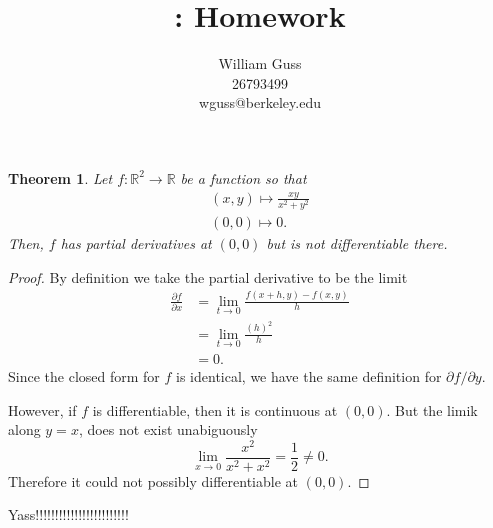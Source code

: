 \documentclass[letter]{article}
\title{\bCLASS: Homework \bHWN}
\author{William Guss\\26793499\\wguss@berkeley.edu}
\newtheorem{theorem}{Theorem}
\newenvironment{menumerate}{%
  \edef\backupindent{\the\parindent}%
  \enumerate%
  \setlength{\parindent}{\backupindent}%
}{\endenumerate}
\begin{document}
\maketitle
\thispagestyle{empty}

\begin{menumerate}
    \setcounter{enumi}{14}
    \item 
    \begin{theorem}
        Let $f: \mathbb{R}^2 \to \mathbb{R}$ be a function so that
        \begin{equation}
            \begin{aligned}
            (x,y) \mapsto \frac{xy}{x^2 + y^2} \\
            (0,0) \mapsto 0.          
            \end{aligned}          
        \end{equation}   
        Then, $f$ has partial derivatives at $(0,0)$ but is not differentiable
        there.
    \end{theorem}
    \begin{proof}
        By definition we take the partial derivative to be the limit
        \begin{equation}
            \begin{aligned}
            \frac{\partial f}{\partial x} &= \lim_{t\to 0} \frac{f(x+h, y) - f(x,y)}{h} \\
            &= \lim_{t\to 0} \frac{{(h)^2}}{h} \\
            &= 0.
            \end{aligned}
         \end{equation} 
         Since the closed form for $f$ is identical, we have the same definition
         for $\partial f / \partial y.$

         However, if $f$ is differentiable, then it is continuous at
         $(0,0).$ But the limik along $y = x$, does not exist unabiguously
         $$\lim_{x\to 0} \frac{x^2}{x^2 + x^2} = \frac12 \neq 0 .$$
         Therefore it could not possibly differentiable at $(0,0).$
    \end{proof}
    \item Yass!!!!!!!!!!!!!!!!!!!!!!!!
        

\end{menumerate}
\end{document}
